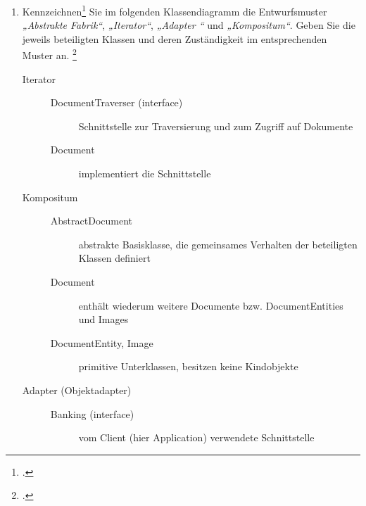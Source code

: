 \documentclass{bschlangaul-aufgabe}
\begin{document}
\begin{enumerate}


\item Kennzeichnen\footcite{examen:66116:2016:03} Sie im folgenden
Klassendiagramm die Entwurfsmuster
\emph{„Abstrakte Fabrik“},
\emph{„Iterator“}, \emph{„Adapter
“} und \emph{„Kompositum“}.
Geben Sie die jeweils beteiligten Klassen und deren Zuständigkeit im
entsprechenden Muster an.
\footcite{sosy:ab:6}

\begin{liAntwort}

\begin{description}

%

\item[Iterator] \strut

\begin{description}
\item[DocumentTraverser (interface)]
Schnittstelle zur Traversierung und zum Zugriff auf Dokumente

\item[Document]
implementiert die Schnittstelle
\end{description}

%

\item[Kompositum] \strut

\begin{description}
\item[AbstractDocument]
abstrakte Basisklasse, die gemeinsames Verhalten der beteiligten
Klassen definiert

\item[Document]
enthält wiederum weitere Documente bzw. DocumentEntities und Images

\item[DocumentEntity, Image]
primitive Unterklassen, besitzen keine Kindobjekte
\end{description}

%

\item[Adapter (Objektadapter)] \strut

\begin{description}
\item[Banking (interface)]
vom Client (hier Application) verwendete Schnittstelle


\end{description}
\end{description}
\end{liAntwort}
\end{enumerate}
\end{document}
